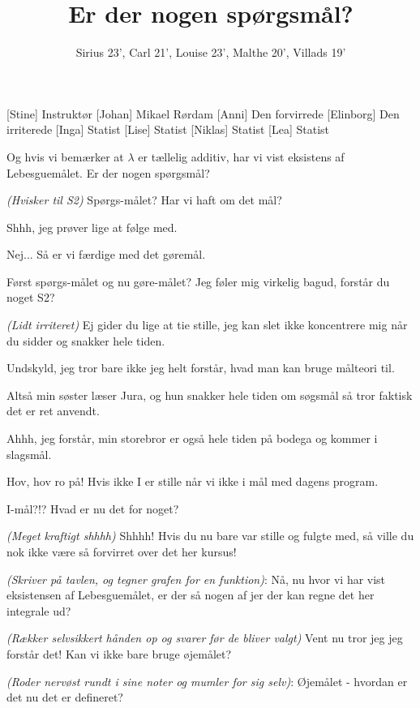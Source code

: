 \documentclass[a4paper,11pt]{article}
\title{Er der nogen spørgsmål?}
\author{Sirius 23', Carl 21', Louise 23’, Malthe 20', Villads 19'}
\begin{document}
\maketitle

\begin{roles}
[Stine] Instruktør
[Johan] Mikael Rørdam
[Anni] Den forvirrede
[Elinborg] Den irriterede 
[Inga] Statist
[Lise] Statist
[Niklas] Statist
[Lea] Statist
\end{roles}


\begin{sketch}

 Og hvis vi bemærker at $\lambda$ er tællelig additiv, har vi vist eksistens af Lebesguemålet. Er der nogen spørgsmål?

 \emph{(Hvisker til S2)} Spørgs-målet? Har vi haft om det mål?

 Shhh, jeg prøver lige at følge med.

 Nej... Så er vi færdige med det gøremål.

 Først spørgs-målet og nu gøre-målet? Jeg føler mig virkelig bagud, forstår du noget S2?

\emph{(Lidt irriteret)} Ej gider du lige at tie stille, jeg kan slet ikke koncentrere
mig når du sidder og snakker hele tiden.

 Undskyld, jeg tror bare ikke jeg helt forstår, hvad man kan bruge målteori til.

 Altså min søster læser Jura, og hun snakker hele tiden om søgsmål så tror faktisk det er ret anvendt.

 Ahhh, jeg forstår, min storebror er også hele tiden på bodega og kommer i slagsmål.


 Hov, hov ro på! Hvis ikke I er stille når vi ikke i mål med dagens program.


 I-mål?!? Hvad er nu det for noget?

\emph{(Meget kraftigt shhhh)} Shhhh! Hvis du nu bare var stille og fulgte med, så ville du nok ikke være så forvirret over det her kursus!

 \emph{(Skriver på tavlen, og tegner grafen for en funktion)}: Nå, nu hvor vi har vist eksistensen af Lebesguemålet, er der så nogen af jer der kan regne det her integrale ud?

\emph{(Rækker selvsikkert hånden op og svarer før de bliver valgt)} Vent nu tror jeg jeg forstår det! Kan vi ikke bare bruge øjemålet?

 \emph{(Roder nervøst rundt i sine noter og mumler for sig selv)}: Øjemålet - hvordan er det nu det er defineret?

\end{sketch}
\end{document}
